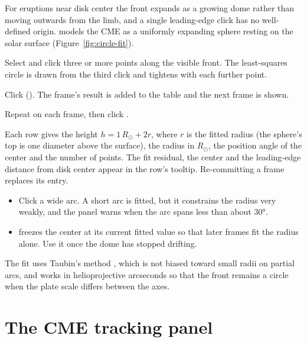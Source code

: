 For eruptions near disk center the front expands as a growing dome rather than moving
outwards from the limb, and a single leading-edge click has no well-defined origin.  models the CME as a uniformly expanding sphere resting on the solar surface
(Figure~\ref{fig:circle-fit}).
\begin{steps}
  \item Select  and click three or more points along the visible front. The
    least-squares circle is drawn from the third click and tightens with each further point.
  \item Click  (). The frame's result is added to the table
    and the next frame is shown.
  \item Repeat on each frame, then click .
\end{steps}
Each row gives the height \(h = 1\,R_\odot + 2r\), where \(r\) is the fitted radius (the
sphere's top is one diameter above the surface), the radius in \(R_\odot\), the position angle
of the center and the number of points. The fit residual, the center and the leading-edge
distance from disk center appear in the row's tooltip. Re-committing a frame replaces its
entry.
\begin{itemize}
  \item Click a wide arc. A short arc is fitted, but it constrains the radius very weakly, and
    the panel warns when the arc spans less than about 30°.
  \item {} freezes the center at its current fitted value so that later frames
    fit the radius alone. Use it once the dome has stopped drifting.
\end{itemize}
The fit uses Taubin's method \parencite{taubin1991}, which is not biased toward small radii on
partial arcs, and works in helioprojective arcseconds so that the front remains a circle when
the plate scale differs between the axes.


\section{The CME tracking panel}
\label{sec:tracking-panel}

